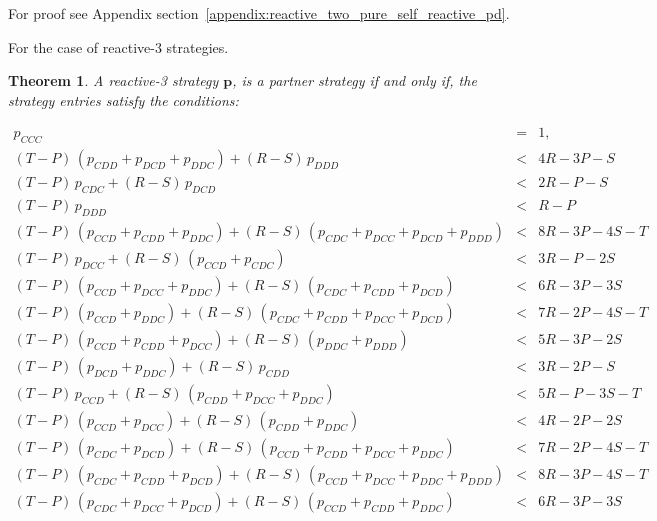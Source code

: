 \documentclass[11pt]{article}
\theoremstyle{plainCl1}
\newtheorem{theorem}{Theorem}[section]
\theoremstyle{plainCl2}
\begin{document}
For proof see Appendix section~\ref{appendix:reactive_two_pure_self_reactive_pd}.


For the case of reactive-3 strategies.

\begin{theorem}\label{theorem:reactive_three_partner_strategies_PD}
A reactive-3 strategy $\mathbf{p}$, is a partner strategy if and only if,
the strategy entries satisfy the conditions:

\begin{equation*}
  \begin{array}{ccc}
    p_{CCC} & = & 1, \\ [0.2cm]
    (T - P)\, (p_{CDD} + p_{DCD} + p_{DDC}) + (R - S)\, p_{DDD}  & < & 4 R - 3 P  - S \\ [0.2cm]
    (T - P)\, p_{CDC}  + (R - S)\, p_{DCD}  & < & 2 R - P  - S \\ [0.2cm]
    (T - P)\, p_{DDD} & < & R - P\\ [0.2cm]
    (T - P)\,(p_{CCD} + p_{CDD} + p_{DDC}) + (R - S)\,(p_{CDC} + p_{DCC} + p_{DCD} + p_{DDD}) & < & 8 R - 3 P - 4 S - T \\ [0.2cm]
    (T - P)\, p_{DCC}  + (R - S)\,(p_{CCD} + p_{CDC}) & < & 3 R - P - 2 S \\ [0.2cm]
    (T - P)\,(p_{CCD} + p_{DCC} + p_{DDC}) + (R - S)\,(p_{CDC} + p_{CDD} + p_{DCD}) & < & 6 R - 3 P - 3 S \\ [0.2cm]
    (T - P)\,(p_{CCD} + p_{DDC}) + (R - S)\,(p_{CDC} + p_{CDD} + p_{DCC} + p_{DCD}) & < & 7 R - 2 P - 4 S - T \\ [0.2cm]
    (T - P)\,(p_{CCD} + p_{CDD} + p_{DCC}) + (R - S)\,(p_{DDC} + p_{DDD}) & < & 5 R - 3 P - 2 S \\ [0.2cm]
    (T - P)\,(p_{DCD} + p_{DDC}) + (R - S)\, p_{CDD}  & < & 3 R - 2 P - S \\ [0.2cm] 
    (T - P)\, p_{CCD} + (R - S)\,(p_{CDD} + p_{DCC} + p_{DDC}) & < & 5 R - P - 3 S - T \\ [0.2cm]
    (T - P)\,(p_{CCD} + p_{DCC}) + (R - S)\,(p_{CDD} + p_{DDC}) & < & 4 R - 2 P - 2 S \\ [0.2cm]
    (T - P)\,(p_{CDC} + p_{DCD}) + (R - S)\,(p_{CCD} + p_{CDD} + p_{DCC} + p_{DDC}) & < & 7 R - 2 P - 4 S - T \\ [0.2cm]
    (T - P)\,(p_{CDC} + p_{CDD} + p_{DCD}) + (R - S)\,(p_{CCD} + p_{DCC} + p_{DDC} + p_{DDD}) & < & 8 R - 3 P - 4 S - T \\ [0.2cm]
    (T - P)\,(p_{CDC} + p_{DCC} + p_{DCD}) + (R - S)\,(p_{CCD} + p_{CDD} + p_{DDC}) & < & 6 R - 3 P - 3 S \\ [0.2cm]

\end{array}
\end{equation*}
\end{theorem}
\end{document}

